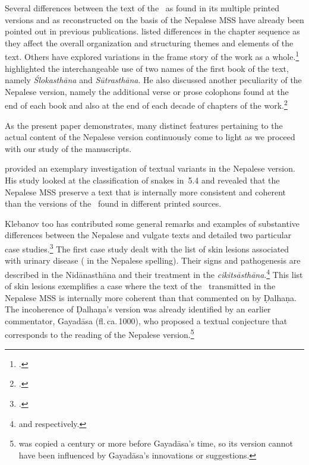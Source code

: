 
Several differences between the text of the \SS\ as found in its multiple printed
versions and as reconstructed on the basis of the Nepalese MSS have already been
pointed out in previous publications.  \citet[27\,f]{kleb-2021b} listed
differences in the chapter sequence as they affect the overall organization and
structuring themes and elements of the text.  Others have explored variations in
the frame story of the work as a whole.\footcites {wuja-2013} [28-32]{kleb-2021b}
{birc-2021} [2-4]{birc-2021a} \citeauthor{kleb-2021b} highlighted the
interchangeable use of two names of the first book of the text, namely
\emph{Ślokasthāna} and \emph{Sūtrasthāna}. He also discussed another peculiarity
of the Nepalese version, namely the additional verse or prose colophons found at
the end of each book and also at the end of each decade of chapters of the
work.\footcite[32--44]{kleb-2021b}

As the present paper demonstrates, many distinct features pertaining to the actual
content of the Nepalese version continuously come to light as we proceed with our
study of the manuscripts. 

\citet[101–104]{hari-2011} provided an exemplary investigation of textual variants in the 
Nepalese version.  His study looked at the classification of snakes in
\SS\,5.4 and revealed that the Nepalese MSS preserve a text that is internally
more consistent and coherent than the versions of the \SS\ found
in different printed sources.

Klebanov too has contributed some general remarks and examples of substantive differences 
between the Nepalese and vulgate texts 
and detailed two particular case studies.\footcite[44--55]{kleb-2021b} The first
case study dealt with the list of skin lesions associated with urinary disease
( in the Nepalese spelling).  Their signs and pathogenesis are
described in the Nidānasthāna and their treatment in the 
\emph{cikitsāsthāna}.\footnote{ and 
 respectively.} 
This list of skin lesions exemplifies a case where the text of the \SS\ transmitted
in the Nepalese MSS is internally more coherent than that commented on by Ḍalhaṇa.
The incoherence of Ḍalhaṇa's version was already identified by an earlier
commentator, Gayadāsa (fl.\,ca.\,1000), 
who
proposed a textual conjecture that corresponds to the reading of the Nepalese
version.\footnote{ was copied a century or more before
    Gayadāsa's time, so its version cannot have been influenced by Gayadāsa's
    innovations or suggestions.} 

